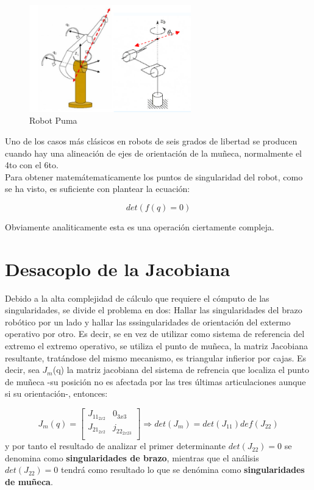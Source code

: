 \documentclass[letter,openright,12pt,spanish]{report}
\begin{document}
\begin{figure}[hbtp]
\centering
\includegraphics[width=7cm]{01.png}
\caption{Robot Puma}
\label{Figura 1}
\end{figure}
Uno de los casos m\'as cl\'asicos en robots de seis grados de libertad se producen cuando hay una alineaci\'on de ejes de orientaci\'on de la mu\~neca, normalmente el 4to con el 6to.\\ 
Para obtener matem\'atematicamente los puntos de singularidad del robot, como se ha visto, es suficiente con plantear la ecuaci\'on:

\begin{displaymath}
det(f(q)=0)
\end{displaymath}

Obviamente analiticamente esta es una operaci\'on ciertamente compleja.

\section{Desacoplo de la Jacobiana}

Debido a la alta complejidad de c\'alculo que requiere el c\'omputo de las singularidades, se divide el problema en dos: Hallar las singularidades del brazo rob\'otico por un lado y hallar las sssingularidades de orientaci\'on del extermo operativo por otro. Es decir, se en vez de utilizar como sistema de referencia del extremo el extremo operativo, se utiliza el punto de mu\~neca, la matriz Jacobiana resultante, trat\'andose del mismo mecanismo, es triangular infierior por cajas. Es decir, sea $\textit{J}_m$(q) la matriz jacobiana del sistema de refrencia que localiza el punto de mu\~neca -su posici\'on no es afectada por las tres \'ultimas articulaciones aunque si su orientaci\'on-, entonces:

\begin{displaymath}
J_m(q)=[
\begin{matrix}
	J_{11_{2x2}} & 0_{3x3}\\
	J_{21_{2x2}} & j_{22_{2x23}}\\
\end{matrix}
]\Longrightarrow det (J_m)=det(J_{11})def(J_{22})
\end{displaymath} 
y por tanto el resultado de analizar el primer determinante $det(J_{22})=0$ se denomina como \textbf{singularidades de brazo}, mientras que el an\'alisis $det(J_{22})=0$ tendr\'a como resultado lo que se den\'omina como \textbf{singularidades de mu\~neca}.
\end{document}
